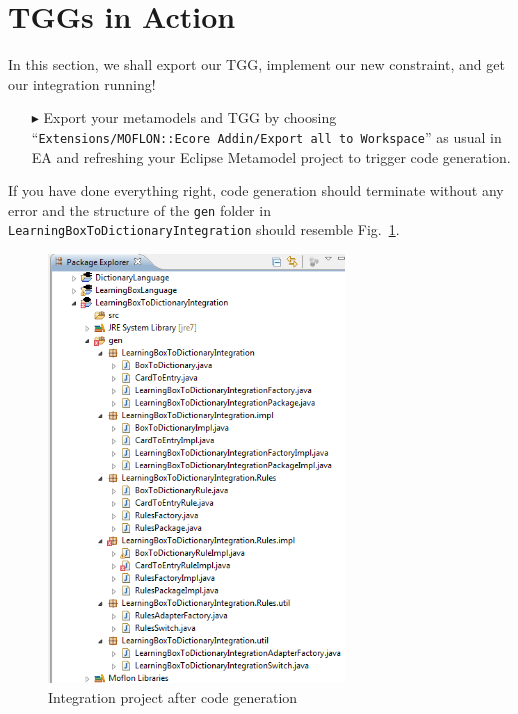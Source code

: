 \section{TGGs in Action}
In this section, we shall export our TGG, implement our new constraint, and get our integration running!
 
\begin{enumerate}
\item[$\blacktriangleright$] Export your metamodels and TGG by choosing ``\texttt{Extensions/\-MOFLON::\-Ecore Addin\-/Export all to Workspace}'' as usual in EA and refreshing your Eclipse Metamodel project to trigger code generation.
\end{enumerate}

If you have done everything right, code generation should terminate without any error and the structure of the \texttt{gen} folder in \texttt{LearningBox\-To\-Dictionary\-Integration} should resemble Fig.~\ref{fig:gen_folder}.

\begin{figure}[htbp]
\begin{center}
  \includegraphics[width=0.7\textwidth]{pics/tggBilder/transformation/tgg22}
  \caption{Integration project after code generation}  
  \label{fig:gen_folder}
\end{center}
\end{figure} 

